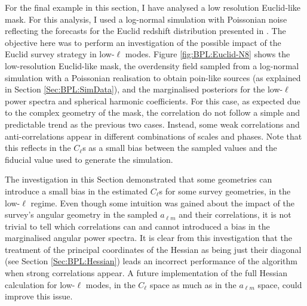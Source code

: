 \qquad For the final example in this section, I have analysed a low resolution Euclid-like mask. For this analysis, I used a \flask log-normal simulation with Poissonian noise reflecting the forecasts for the Euclid redshift distribution presented in \cite{2011EuclidRedPaper}. The objective here was to perform an investigation of the possible impact of the Euclid survey strategy in low-$\ell$ modes. Figure \ref{fig:BPL:Euclid-N8} shows the low-resolution Euclid-like mask, the overdensity field sampled from a log-normal simulation with a Poissonian realisation to obtain poin-like sources (as explained in Section \ref{Sec:BPL:SimData}), and the marginalised posteriors for the low-$\ell$ power spectra and spherical harmonic coefficients. For this case, as expected due to the complex geometry of the mask, the correlation do not follow a simple and predictable trend as the previous two cases. Instead, some weak correlations and anti-correlations appear in different combinations of scales and phases. Note that this reflects in the $C_{\ell}$s as a small bias between the sampled values and the fiducial value used to generate the simulation.

\qquad The investigation in this Section demonstrated that some geometries can introduce a small bias in the estimated $C_{\ell}$s for some survey geometries, in the low-$\ell$ regime. Even though some intuition was gained about the impact of the survey's angular geometry in the sampled $a_{\ell m}$ and their correlations, it is not trivial to tell which correlations can and cannot introduced a bias in the marginalised angular power spectra. It is clear from this investigation that the treatment of the principal coordinates of the Hessian as being just their diagonal (see Section \ref{Sec:BPL:Hessian}) leads an incorrect performance of the algorithm when strong correlations appear. A future implementation of the full Hessian calculation for low-$\ell$ modes, in the $C_{\ell}$ space as much as in the $a_{\ell m}$ space, could improve this issue.





